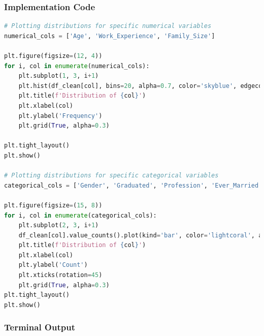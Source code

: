 \documentclass[12pt,a4paper]{article}
\begin{document}
\subsubsection{Implementation Code}
\begin{lstlisting}[language=Python, caption=Plot Distributions of Variables]
# Plotting distributions for specific numerical variables 
numerical_cols = ['Age', 'Work_Experience', 'Family_Size']

plt.figure(figsize=(12, 4))
for i, col in enumerate(numerical_cols):
    plt.subplot(1, 3, i+1)
    plt.hist(df_clean[col], bins=20, alpha=0.7, color='skyblue', edgecolor='black')
    plt.title(f'Distribution of {col}')
    plt.xlabel(col)
    plt.ylabel('Frequency')
    plt.grid(True, alpha=0.3)

plt.tight_layout()
plt.show()

# Plotting distributions for specific categorical variables
categorical_cols = ['Gender', 'Graduated', 'Profession', 'Ever_Married', 'Var_1', 'Segmentation']

plt.figure(figsize=(15, 8))
for i, col in enumerate(categorical_cols):
    plt.subplot(2, 3, i+1)
    df_clean[col].value_counts().plot(kind='bar', color='lightcoral', alpha=0.8)
    plt.title(f'Distribution of {col}')
    plt.xlabel(col)
    plt.ylabel('Count')
    plt.xticks(rotation=45)
    plt.grid(True, alpha=0.3)
plt.tight_layout()
plt.show()
\end{lstlisting}

\subsubsection{Terminal Output}
\end{document}
